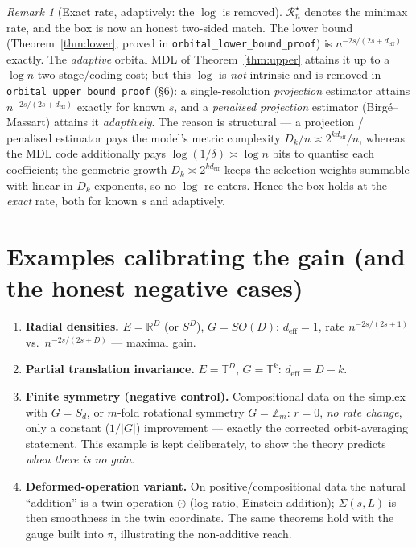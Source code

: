 \documentclass[11pt]{article}
\theoremstyle{plain}
\theoremstyle{definition}
\theoremstyle{remark}
\newtheorem{remark}[theorem]{Remark}
\newcommand{\R}{\mathbb{R}}
\begin{document}
\begin{remark}[Exact rate, adaptively: the $\log$ is removed]
$\mathcal R_n^\star$ denotes the minimax rate, and the box is now an honest
two-sided match. The lower bound (Theorem~\ref{thm:lower}, proved in
\texttt{orbital\_lower\_bound\_proof}) is $n^{-2s/(2s+d_{\mathrm{eff}})}$ exactly.
The \emph{adaptive} orbital MDL of Theorem~\ref{thm:upper} attains it up to a
$\log n$ two-stage/coding cost; but this $\log$ is \emph{not} intrinsic and is
removed in \texttt{orbital\_upper\_bound\_proof} (\S6): a single-resolution
\emph{projection} estimator attains $n^{-2s/(2s+d_{\mathrm{eff}})}$ exactly for
known $s$, and a \emph{penalised projection} estimator (Birg\'e--Massart) attains
it \emph{adaptively}. The reason is structural --- a projection / penalised
estimator pays the model's metric complexity $D_k/n\asymp2^{kd_{\mathrm{eff}}}/n$,
whereas the MDL code additionally pays $\log(1/\delta)\asymp\log n$ bits to
quantise each coefficient; the geometric growth $D_k\asymp2^{kd_{\mathrm{eff}}}$
keeps the selection weights summable with linear-in-$D_k$ exponents, so no $\log$
re-enters. Hence the box holds at the \emph{exact} rate, both for known $s$ and
adaptively.
\end{remark}

\section{Examples calibrating the gain (and the honest negative cases)}

\begin{enumerate}[label=(\alph*)]
\item \textbf{Radial densities.} $E=\R^D$ (or $S^D$), $G=SO(D)$:
$d_{\mathrm{eff}}=1$, rate $n^{-2s/(2s+1)}$ vs.\ $n^{-2s/(2s+D)}$ --- maximal gain.
\item \textbf{Partial translation invariance.} $E=\mathbb T^D$, $G=\mathbb T^k$:
$d_{\mathrm{eff}}=D-k$.
\item \textbf{Finite symmetry (negative control).} Compositional data on the
simplex with $G=S_d$, or $m$-fold rotational symmetry $G=\mathbb Z_m$: $r=0$,
\emph{no rate change}, only a constant ($1/|G|$) improvement --- exactly the
corrected orbit-averaging statement. This example is kept deliberately, to show
the theory predicts \emph{when there is no gain}.
\item \textbf{Deformed-operation variant.} On positive/compositional data the
natural ``addition'' is a twin operation $\odot$ (log-ratio, Einstein addition);
$\Sigma(s,L)$ is then smoothness in the twin coordinate. The same theorems hold
with the gauge built into $\pi$, illustrating the non-additive reach.
\end{enumerate}
\end{document}

